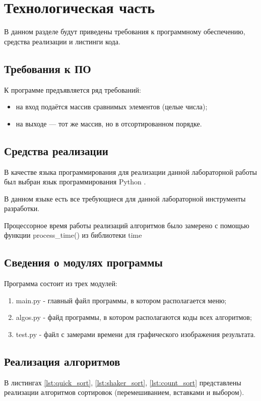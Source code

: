 \chapter{Технологическая часть}

В данном разделе будут приведены требования к программному обеспечению, средства реализации и листинги кода.

\section{Требования к ПО}

К программе предъявляется ряд требований:
\begin{itemize}
	\item на вход подаётся массив сравнимых элементов (целые числа);
	\item на выходе — тот же массив, но в отсортированном порядке.
\end{itemize}

\section{Средства реализации}

В качестве языка программирования для реализации данной лабораторной работы был выбран язык программирования Python \cite{pythonlang}. 

В данном языке есть все требующиеся для данной лабораторной инструменты разработки. 

Процессорное время работы реализаций алгоритмов было замерено с помощью функции process\_time() из библиотеки time \cite{pythonlangtime}

\section{Сведения о модулях программы}
Программа состоит из трех модулей:
\begin{enumerate}
	\item main.py - главный файл программы, в котором располагается меню;
	\item algos.py - файд программы, в котором располагаются коды всех алгоритмов;
	\item test.py - файл с замерами времени для графического изображения результата.
\end{enumerate}


\section{Реализация алгоритмов}
В листингах \ref{lst:quick_sort}, \ref{lst:shaker_sort}, \ref{lst:count_sort} представлены реализации алгоритмов сортировок (перемешиванием, вставками и выбором).

